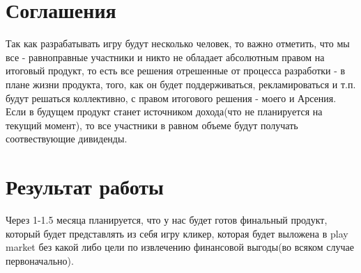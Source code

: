 \documentclass{article}
\begin{document}
\section{Соглашения}

Так как разрабатывать игру будут несколько человек, то важно отметить, что мы все - равноправные участники и никто не обладает абсолютным правом на итоговый продукт, то есть все решения отрешенные от процесса разработки - в плане жизни продукта, того, как он будет поддерживаться, рекламироваться и т.п. будут решаться коллективно, с правом итогового решения - моего и Арсения. Если в будущем продукт станет источником дохода(что не планируется на текущий момент), то все участники в равном объеме будут получать соотвествующие дивиденды.

\section{Результат работы}

Через 1-1.5 месяца планируется, что у нас будет готов финальный продукт, который будет представлять из себя игру кликер, которая будет выложена в play market без какой либо цели по извлечению финансовой выгоды(во всяком случае первоначально). 
\end{document}
